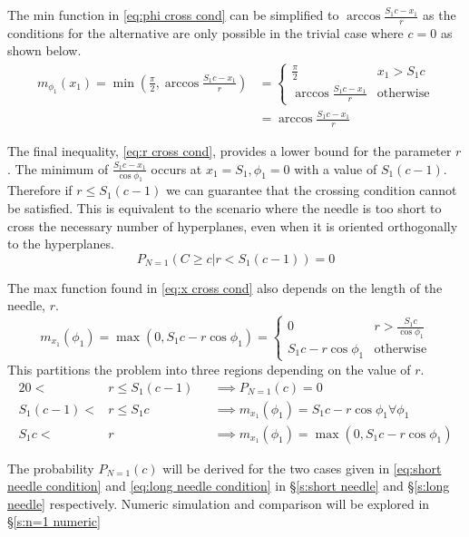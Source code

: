 \documentclass{article}
\begin{document}
The min function in \ref{eq:phi cross cond} can be simplified to $\arccos\frac{S_1c-x_1}{r}$ as the conditions for the alternative are
only possible in the trivial case where $c=0$ as shown below.
\begin{align}
	m_{\phi_1}(x_1) = \min(\frac{\pi}{2}, \arccos\frac{S_1c-x_1}{r}) &= \begin{cases}
		\frac{\pi}{2} & x_1>S_1c \\
		\arccos\frac{S_1c-x_1}{r} & \text{otherwise}
	\end{cases} \\
	&= \arccos\frac{S_1c-x_1}{r} 
\end{align}

The final inequality, \ref{eq:r cross cond}, provides a lower bound for the parameter $r$. The minimum of $\frac{S_1c - x_1}{\cos{\phi_1}}$
occurs at $x_1=S_1, \phi_1=0$ with a value of $S_1(c-1)$. Therefore if $r\le S_1(c-1)$ we can guarantee that the crossing condition
cannot be satisfied. This is equivalent to the scenario where the needle is too short to cross the necessary number of hyperplanes, even when it is oriented
orthogonally to the hyperplanes.
\begin{equation}
	P_{N=1}(C\ge c|r<S_1(c-1)) = 0
\end{equation}

The max function found in \ref{eq:x cross cond} also depends on the length of the needle, $r$. 
\begin{equation}
	m_{x_1}(\phi_1) = \max(0, S_1c-r\cos\phi_1) = \begin{cases}
		0 & r > \frac{S_1c}{\cos\phi_1} \\
		S_1c-r\cos\phi_1 & \text{otherwise}
	\end{cases}
\end{equation}
This partitions the problem into three regions depending on the value of $r$. 
\begin{alignat}{2}
	0 < &r \le S_1(c-1) &&\implies P_{N=1}(c) = 0 \\
	S_1(c-1) < &r \le S_1c &&\implies m_{x_1}(\phi_1) = S_1c-r\cos\phi_1 \forall \phi_1 \label{eq:short needle condition}\\
	S_1c < &r &&\implies m_{x_1}(\phi_1) = \max(0, S_1c -r\cos\phi_1) \label{eq:long needle condition}
\end{alignat}

The probability $P_{N=1}(c)$ will be derived for the two cases given in \ref{eq:short needle condition} and \ref{eq:long needle condition}
in \S \ref{s:short needle} and \S \ref{s:long needle} respectively. Numeric simulation and comparison will be explored in \S \ref{s:n=1 numeric}
\end{document}
